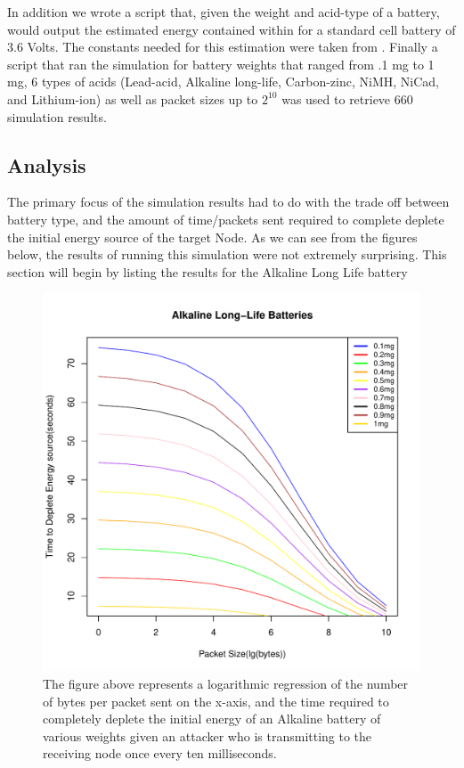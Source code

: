 In addition we wrote a script that, given the weight and acid-type of a battery, would output the estimated energy contained within for
a standard cell battery of 3.6 Volts. The constants needed for this estimation were taken from \cite{Doe:2009:Misc}. Finally a script that 
ran the simulation for battery weights that ranged from .1 mg to 1 mg, 6 types of acids (Lead-acid, Alkaline long-life, Carbon-zinc, 
NiMH, NiCad, and Lithium-ion) as well as packet sizes up to $2^{10}$ was used to retrieve 660 simulation results. 

\subsection{Analysis}
The primary focus of the simulation results had to do with the trade off between battery type, and the amount of time/packets sent
required to complete deplete the initial energy source of the target Node. As we can see from the figures below, the results of running this simulation were not extremely surprising. This section will begin by listing the results for the Alkaline Long Life battery

\begin{figure}[h!]
\centering
{}
\includegraphics[width=\linewidth]{Figures/BatteryDeplition/ALLiBAT.pdf}
\caption{The figure above represents a logarithmic regression of the number of bytes per packet sent on the x-axis, and the time required to completely deplete the initial energy of an Alkaline battery of various weights given an attacker who is transmitting to the receiving node once every ten milliseconds.}
\end{figure}

